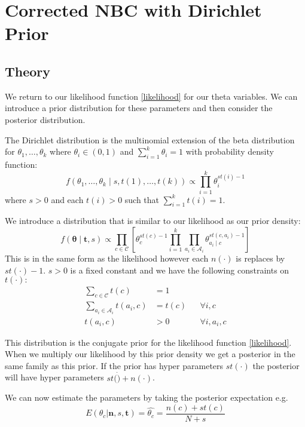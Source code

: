 \chapter{Corrected NBC with Dirichlet Prior}

\section{Theory}

We return to our likelihood function \cref{likelihood} for our theta variables.
We can introduce a prior distribution for these parameters and then consider the posterior distribution.

The Dirichlet distribution is the multinomial extension of the beta distribution for $\theta_1,\dots,\theta_k$ where $\theta_i \in (0,1)$ and $\sum_{i=1}^k \theta_i = 1$ with probability density function:
\begin{equation} \label{dirichlet_pdf}
	f(\theta_1,\dots,\theta_k \mid s, t(1),\dots,t(k)) \propto \prod_{i=1}^k \theta_i^{st(i) - 1}
\end{equation}
where $s > 0$ and each $t(i)>0$ such that $\sum_{i=1}^{k}t(i) = 1$.

We introduce a distribution that is similar to our likelihood as our prior density:
\begin{equation} \label{prior}
	f(\mathbf{\theta} \mid \mathbf{t}, s) \propto \prod_{c \in \mathcal{C}} \left[ \theta_c^{st(c) - 1} \prod_{i=1}^k \prod_{a_i \in \mathcal{A}_i} \theta_{a_i \mid c}^{st(c, a_i) - 1} \right]
\end{equation}
This is in the same form as the likelihood however each $n(\cdot)$ is replaces by $st(\cdot) - 1$.
$s > 0$ is a fixed constant and we have the following constraints on $t(\cdot):$
\begin{align}\label{prior_constraints}
	\sum_{c \in \mathcal{C}} t(c) & = 1 \\
	\sum_{a_i \in \mathcal{A}_i} t(a_i, c) & = t(c) && \forall i, c \\
	t(a_i, c) & > 0 && \forall i, a_i, c
\end{align}

This distribution is the conjugate prior for the likelihood function \cref{likelihood}.
When we multiply our likelihood by this prior density we get a posterior in the same family as this prior.
If the prior has hyper parameters $st(\cdot)$ the posterior will have hyper parameters $st(\dot) + n(\cdot)$.

We can now estimate the parameters by taking the posterior expectation e.g.
\begin{equation}
	E(\theta_c|\mathbf{n},s,\mathbf{t})=\hat{\theta_c} = \frac{n(c) + st(c)}{N + s}
\end{equation}

